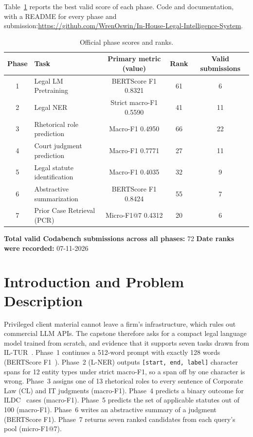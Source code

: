 \documentclass[11pt, oneside]{article}
\begin{document}
\noindent
Table~\ref{tab:leaderboard} reports the best valid score of each phase. Code and documentation, with a README for
every phase and submission:\newline \url{https://github.com/WrenOswin/In-House-Legal-Intelligence-System}.
\begin{table}[H]
\centering
\caption{Official phase scores and ranks.}
\label{tab:leaderboard}
\begin{tabular}{clccc}
\toprule
Phase & Task & Primary metric (value) & Rank & Valid submissions \\
\midrule
1 & Legal LM Pretraining & BERTScore F1 0.8321 & 61 & 6 \\
2 & Legal NER & Strict macro-F1 0.5590 & 41 & 11 \\
3 & Rhetorical role prediction & Macro-F1 0.4950 & 66 & 22 \\
4 & Court judgment prediction & Macro-F1 0.7771 & 27 & 11 \\
5 & Legal statute identification & Macro-F1 0.4035 & 32 & 9 \\
6 & Abstractive summarization & BERTScore F1 0.8424 & 55 & 7 \\
7 & Prior Case Retrieval (PCR) & Micro-F1@7 0.4312 & 20 & 6 \\
\bottomrule
\end{tabular}
\end{table}
\noindent
\textbf{Total valid Codabench submissions across all phases:} 72
\quad
\textbf{Date ranks were recorded:} 07-11-2026
\medskip

\section{Introduction and Problem Description}
Privileged client material cannot leave a firm's infrastructure, which rules out commercial LLM APIs. The capstone
therefore asks for a compact legal language model trained from scratch, and evidence that it supports seven tasks
drawn from IL-TUR~\cite{joshi2024iltur}. Phase~1 continues a 512-word prompt with exactly 128 words (BERTScore
F1~\cite{zhang2020bertscore}). Phase~2 (L-NER) outputs \texttt{[start, end, label]} character spans for 12 entity
types under strict macro-F1, so a span off by one character is wrong. Phase~3 assigns one of 13 rhetorical roles to
every sentence of Corporate Law (CL) and IT judgments (macro-F1). Phase~4 predicts a binary outcome for
ILDC~\cite{malik2021ildc} cases (macro-F1). Phase~5 predicts the set of applicable statutes out of 100 (macro-F1).
Phase~6 writes an abstractive summary of a judgment (BERTScore F1). Phase~7 returns seven ranked candidates from each
query's pool (micro-F1@7).
\end{document}
